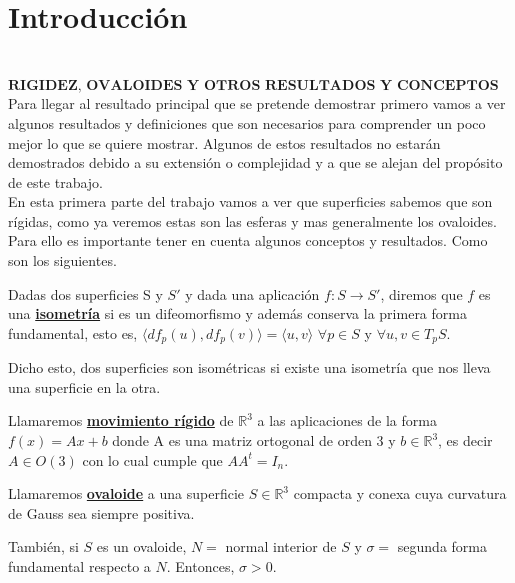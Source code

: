 \chapter*{Introducción}


${ }$\\
$\textbf{RIGIDEZ, OVALOIDES Y OTROS RESULTADOS Y CONCEPTOS}$
${ }$\\

Para llegar al resultado principal que se pretende demostrar primero vamos a ver algunos resultados y definiciones que son necesarios para comprender un poco mejor lo que se quiere mostrar. Algunos de estos resultados no estarán demostrados debido a su extensión o complejidad y a que se alejan del propósito de este trabajo.
${ }$\\

En esta primera parte del trabajo vamos a ver que superficies sabemos que son rígidas, como ya veremos estas son las esferas y mas generalmente los ovaloides. Para ello es importante tener en cuenta algunos conceptos y resultados. Como son los siguientes.

\begin{definicion}\label{def:isom} %
	Dadas dos superficies S y $S'$ y dada una aplicación $f : S \longrightarrow S'$, diremos que $f$ es una \underline{\textbf{isometría}} si es un difeomorfismo y además conserva la primera forma fundamental, esto es, $\langle df_p(u), df_p(v)\rangle = \langle u, v\rangle$ $\forall p \in S$ y $\forall u,v \in T_p S$.
\end{definicion}

Dicho esto, dos superficies son isométricas si existe una isometría que nos lleva una superficie en la otra.

\begin{definicion}
	Llamaremos \underline{\textbf{movimiento rígido}} de $\mathbb{R}^3$ a las aplicaciones de la forma $f(x) = Ax + b$ donde A es una matriz ortogonal de orden 3 y $b \in \mathbb{R}^3$, es decir $A \in O(3)$ con lo cual cumple que $AA^{t} = I_{n}$.
\end{definicion}

\begin{definicion}
	Llamaremos \underline{\textbf{ovaloide}} a una superficie $S \in \mathbb{R}^3$ compacta y conexa cuya curvatura de Gauss sea siempre positiva.
	
	También, si $S$ es un ovaloide, $N =$ normal interior de $S$ y $\sigma =$ segunda forma fundamental respecto a $N$. Entonces, $\sigma > 0$.
\end{definicion}

